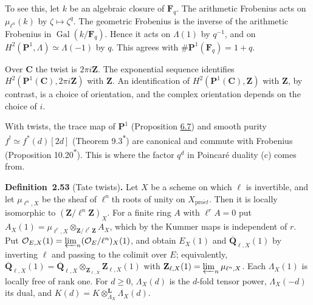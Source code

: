 \documentclass[11pt]{article}
\newenvironment{bpstatement}[2]{\par\addvspace{0.6\baselineskip}\noindent\textbf{#1}#2\textbf{.}\enspace\ignorespaces}
  {\par\addvspace{0.4\baselineskip}}
\newcommand{\bpout}[1]{#1\textsuperscript{\hyperlink{bp-outside}{\ensuremath{\ast}}}}
\providecommand{\QbarX}{}\renewcommand{\QbarX}{\overline{\mathbf Q}_{\ell,X}}
\begin{document}
To see this, let \(k\) be an algebraic closure of \(\mathbf F_q\). The arithmetic Frobenius acts on \(\mu_{\ell^n}(k)\) by \(\zeta\mapsto\zeta^q\). The geometric Frobenius is the inverse of the arithmetic Frobenius in \(\operatorname{Gal}(k/\mathbf F_q)\). Hence it acts on \(\Lambda(1)\) by \(q^{-1}\), and on \(H^2(\mathbf P^1,\Lambda)\simeq\Lambda(-1)\) by \(q\). This agrees with \(\#\mathbf P^1(\mathbf F_q)=1+q\).

Over \(\mathbf C\) the twist is \(2\pi i\mathbf Z\). The exponential sequence identifies \(H^2(\mathbf P^1(\mathbf C),2\pi i\mathbf Z)\) with \(\mathbf Z\). An identification of \(H^2(\mathbf P^1(\mathbf C),\mathbf Z)\) with \(\mathbf Z\), by contrast, is a choice of orientation, and the complex orientation depends on the choice of \(i\).

With twists, the trace map of \(\mathbf P^1\) (Proposition \hyperref[bp534]{6.7}) and smooth purity \(f^!\simeq f^*(d)[2d]\) (Theorem \bpout{9.3}) are canonical and commute with Frobenius (Proposition \bpout{10.20}). This is where the factor \(q^d\) in Poincaré duality (c) comes from.

\label{bp164}%
\begin{bpstatement}{Definition~2.53}{ (Tate twists)}
Let \(X\) be a scheme on which \(\ell\) is invertible, and let \(\mu_{\ell^n,X}\) be the sheaf of \(\ell^n\)th roots of unity on \(X_{\mathrm{pro}\acute{e}t}\). Then it is locally isomorphic to \((\mathbf Z/\ell^n\mathbf Z)_X\). For a finite ring \(A\) with \(\ell^rA=0\) put \(A_X(1)=\mu_{\ell^r,X}\otimes_{\mathbf Z/\ell^r\mathbf Z}A_X\), which by the Kummer maps is independent of \(r\). Put \(\mathcal O_{E,X}(1)=\varprojlim_n(\mathcal O_E/\ell^n)_X(1)\), and obtain \(E_X(1)\) and \(\QbarX(1)\) by inverting \(\ell\) and passing to the colimit over \(E\); equivalently, \(\QbarX(1)=\QbarX\otimes_{\mathbf Z_{\ell,X}}\mathbf Z_{\ell,X}(1)\) with \(\mathbf Z_{\ell,X}(1)=\varprojlim_n\mu_{\ell^n,X}\). Each \(\Lambda_X(1)\) is locally free of rank one. For \(d\ge0\), \(\Lambda_X(d)\) is the \(d\)-fold tensor power, \(\Lambda_X(-d)\) its dual, and \(K(d)=K\otimes^{\mathbf L}_{\Lambda_X}\Lambda_X(d)\).
\end{bpstatement}


\end{document}
